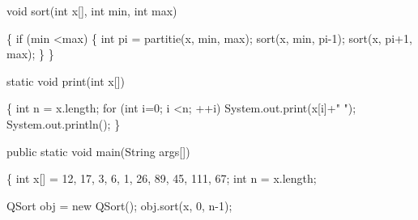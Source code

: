 \documentclass{report}
\begin{document}
       void sort(int x[], int min, int max)
       
       \{\newline
       \hspace*{1cm}if (min \textless max)\newline
       \hspace*{1cm}\{\newline
        \hspace*{1.5cm}int pi = partitie(x, min, max);\newline
		\hspace*{1.5cm}sort(x, min, pi-1);\newline
		\hspace*{1.5cm}sort(x, pi+1, max);\newline
        \hspace*{1cm}\}\newline
           \}\newline
           
       static void print(int x[])
       
       \{\newline
       \hspace*{1cm}int n = x.length;\newline
       \hspace*{1cm}for (int i=0; i \textless n; ++i)\newline
        \hspace*{1.5cm}System.out.print(x[i]+" ");\newline
        \hspace*{1cm}System.out.println();\newline
           \}\newline    
           
       public static void main(String args[])
       
       \{\newline
       \hspace*{1cm}int x[] = {12, 17, 3, 6, 1, 26, 89, 45, 111, 67};\newline
       \hspace*{1cm}int n = x.length;\newline
       
       \hspace*{1cm}QSort obj = new QSort();\newline
       \hspace*{1cm}obj.sort(x, 0, n-1);\newline
       
\end{document}
